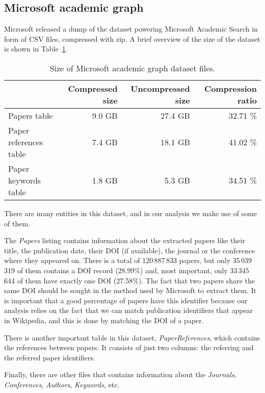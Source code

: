 \subsection{Microsoft academic graph}
\label{sec:mag_dataset}
Microsoft released a dump of the dataset powering Microsoft Academic Search in form of CSV files, compressed with zip.
A brief overview of the size of the dataset is shown in Table~\ref{tbl:mag_size}.

\begin{table}[h]
\centering
\caption{Size of Microsoft academic graph dataset files.}
\label{tbl:mag_size}
\begin{tabular}{@{}lrrr@{}}
\multicolumn{1}{c}{\textbf{}} & \textbf{Compressed size} & \textbf{Uncompressed size} & \textbf{Compression ratio} \\ \midrule
Papers table                &      9.0 GB &    27.4 GB & 32.71 \% \\
Paper references table      &      7.4 GB &    18.1 GB & 41.02 \% \\
Paper keywords table        &      1.8 GB &     5.3 GB & 34.51 \%
\end{tabular}
\end{table}

There are many entities in this dataset, and in our analysis we make use of some of them.

The \emph{Papers} listing contains information about the extracted papers like their title, the publication date, their \ac{DOI} (if available), the journal or the conference where they appeared on.
There is a total of 120\,887\,833 papers, but only 35\,039\,319 of them contains a \ac{DOI} record (28.99\%) and, most important, only 33\,345\,644 of them have exactly one \ac{DOI} (27.58\%).
The fact that two papers share the same \ac{DOI} should be sought in the method used by Microsoft to extract them.
It is important that a good percentage of papers have this identifier because our analysis relies on the fact that we can match publication identifiers that appear in Wikipedia, and this is done by matching the \ac{DOI} of a paper.

There is another important table in this dataset, \emph{PaperReferences}, which contains the references between papers.
It consists of just two columns: the referring and the referred paper identifiers.

Finally, there are other files that contains information about the \emph{Journals}, \emph{Conferences}, \emph{Authors}, \emph{Keywords}, etc.

